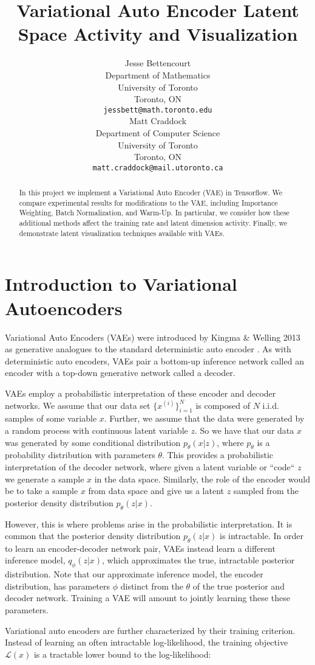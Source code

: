 \documentclass{article} %
\title{Variational Auto Encoder Latent Space Activity and Visualization}
\author{
Jesse Bettencourt\\
Department of Mathematics\\
University of Toronto\\
Toronto, ON \\
\texttt{jessbett@math.toronto.edu} \\
\And
Matt Craddock\\
Department of Computer Science\\
University of Toronto\\
Toronto, ON \\
\texttt{matt.craddock@mail.utoronto.ca} \\
}
\numberwithin{figure}{section}
\renewcommand{\L}{\mathcal{L}}
\begin{document}
\maketitle

\begin{abstract}
In this project we implement a Variational Auto Encoder (VAE) in Tensorflow. We compare experimental results for modifications to the VAE, including Importance Weighting, Batch Normalization, and Warm-Up. In particular, we consider how these additional methods affect the training rate and latent dimension activity. Finally, we demonstrate latent visualization techniques available with VAEs.
\end{abstract}

\section{Introduction to Variational Autoencoders}

Variational Auto Encoders (VAEs) were introduced by Kingma \& Welling 2013 as generative analogues to the standard deterministic auto encoder \cite{Kingma2013}. As with deterministic auto encoders, VAEs pair a bottom-up inference network called an encoder with a top-down generative network called a decoder. 
\par VAEs employ a probabilistic interpretation of these encoder and decoder networks. We assume that our data set $\{x^{(i)}\}_{i=1}^N$ is composed of $N$ i.i.d. samples of some variable $x$. Further, we assume that the data were generated by a random process with continuous latent variable $z$. So we have that our data $x$ was generated by some conditional distribution $p_\theta(x|z)$, where $p_\theta$ is a probability distribution with parameters $\theta$. This provides a probabilistic interpretation of the decoder network, where given a latent variable or ``code`` $z$ we generate a sample $x$ in the data space. Similarly, the role of the encoder would be to take a sample $x$ from data space and give us a latent $z$ sampled from the posterior density distribution $p_\theta(z|x)$. 
\par However, this is where problems arise in the probabilistic interpretation. It is common that the posterior density distribution $p_\theta(z|x)$ is intractable. In order to learn an encoder-decoder network pair, VAEs instead learn a different inference model, $q_\phi(z|x)$, which approximates the true, intractable posterior distribution. Note that our approximate inference model, the encoder distribution, has parameters $\phi$ distinct from the $\theta$ of the true posterior and decoder network. Training a VAE will amount to jointly learning these these parameters.
\par Variational auto encoders are further characterized by their training criterion. Instead of learning an often intractable log-likelihood, the training objective $\L(x)$ is a tractable lower bound to the log-likelihood:
\end{document}
